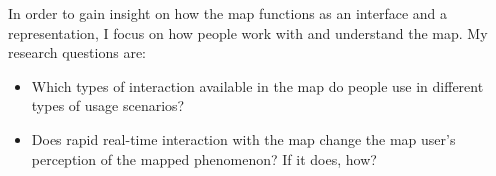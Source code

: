 





In order to gain insight on how the map functions as an interface and a representation,
I focus on how people work with and understand the map.
My research questions are:  %

\begin{itemize}
	\item Which types of interaction available in the map do people use
	in different types of usage scenarios?
	\item Does rapid real-time interaction with the map change
	the map user's perception of the mapped phenomenon? If it does, how?
\end{itemize}

